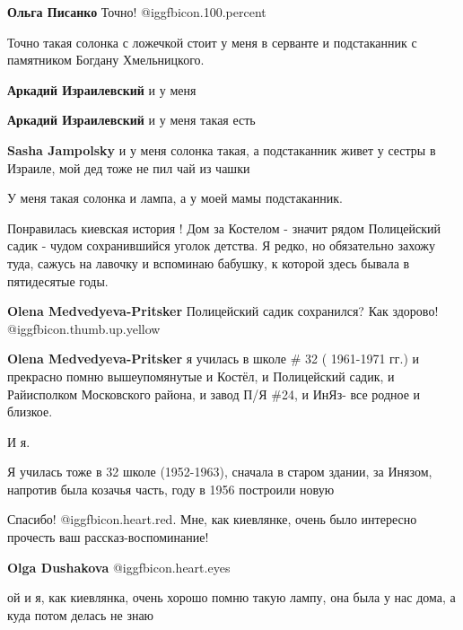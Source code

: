 \begin{itemize}
\textbf{Ольга Писанко} Точно! @igg{fbicon.100.percent} 


Точно такая солонка с ложечкой стоит у меня в серванте и подстаканник с
памятником Богдану Хмельницкого.

\begin{itemize} %
\textbf{Аркадий Израилевский} и у меня

\textbf{Аркадий Израилевский} и у меня такая есть

\textbf{Sasha Jampolsky} и у меня солонка такая, а подстаканник живет у сестры в Израиле, мой дед тоже не пил чай из чашки
\end{itemize} %

У меня такая солонка и лампа, а у моей мамы подстаканник.


Понравилась киевская история ! Дом за Костелом - значит рядом Полицейский садик
- чудом сохранившийся уголок детства. Я редко, но обязательно захожу туда,
сажусь на лавочку и вспоминаю бабушку, к которой здесь бывала в пятидесятые
годы.

\begin{itemize} %
\textbf{Olena Medvedyeva-Pritsker} Полицейский садик сохранился? Как здорово!  @igg{fbicon.thumb.up.yellow} 

\textbf{Olena Medvedyeva-Pritsker} я училась в школе \# 32 ( 1961-1971 гг.) и прекрасно помню вышеупомянутые и Костёл, и Полицейский садик, и Райисполком Московского района, и завод П/Я \#24, и ИнЯз- все родное и близкое.


И я.

Я училась тоже в 32 школе (1952-1963), сначала в старом здании, за Инязом,
напротив была козачья часть, году в 1956 построили новую
\end{itemize} %


Спасибо! @igg{fbicon.heart.red}. Мне, как киевлянке, очень было интересно
прочесть ваш рассказ-воспоминание!

\begin{itemize} %
\textbf{Olga Dushakova}  @igg{fbicon.heart.eyes} 

ой и я, как киевлянка, очень хорошо помню такую лампу, она была у нас дома, а куда потом делась не знаю
\end{itemize} %


\end{itemize}
